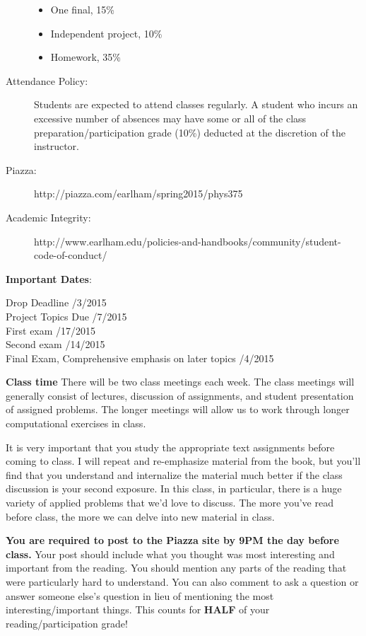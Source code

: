 \documentclass[12pt]{article}
\begin{document}
\begin{description}
\begin{itemize}
  \item One final, 15\%
  \item Independent project, 10\%
  \item Homework, 35\%
\end{itemize}\vspace{-.2in}
\item[Attendance Policy:] Students are expected to attend classes regularly. A student who incurs an excessive
number of absences may have some or all of the class preparation/participation grade (10\%) deducted at the discretion of the instructor.
\item[Piazza:] http://piazza.com/earlham/spring2015/phys375
\item[Academic Integrity:] {\small http://www.earlham.edu/policies-and-handbooks/community/student-code-of-conduct/}
\end{description}
\noindent\textbf{Important Dates}:
\begin{center} \begin{minipage}{5in}
\begin{flushleft}
Drop Deadline /3/2015\\
Project Topics Due /7/2015\\
First exam /17/2015\\ 
Second exam /14/2015\\ 
Final Exam, Comprehensive emphasis on later topics /4/2015\\
\end{flushleft}
\end{minipage}
\end{center}

\pagebreak
\noindent\textbf{Class time} There will be two class meetings
each week. The class meetings will generally consist of lectures,
discussion of assignments, and student presentation of assigned
problems. The longer meetings will allow us to work through longer
computational exercises in class.

It is very important that you study the appropriate text assignments
before coming to class. I will repeat and re-emphasize material from
the book, but you'll find that you understand and internalize the
material much better if the class discussion is your second
exposure. In this class, in particular, there is a huge variety of
applied problems that we'd love to discuss. The more you've read
before class, the more we can delve into new material in class.

\textbf{You are required to post to the Piazza site by 9PM the day
  before class.} Your post should include what you thought was most
interesting and important from the reading. You should mention any
parts of the reading that were particularly hard to understand. You
can also comment to ask a question or answer someone else's question
in lieu of mentioning the most interesting/important things.
This
counts for \textbf{HALF} of your reading/participation grade! 
\end{document}
